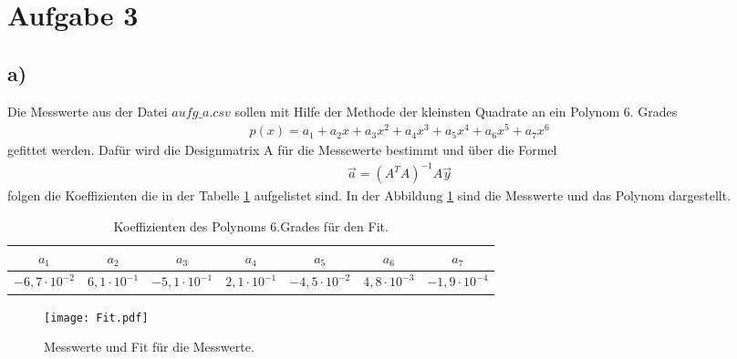 \newpage
\section{Aufgabe 3}
\label{sec:a1}
\subsection{a)}
\label{subsec:a1}

Die Messwerte aus der Datei $aufg\_a.csv$ sollen mit Hilfe der
Methode der kleinsten Quadrate an ein Polynom 6. Grades
\begin{align}
p(x)=a_1+a_2x+a_3x^2+ a_4x^3+a_5x^4+a_6x^5+a_7x^6
\end{align}
gefittet werden.
Dafür wird die Designmatrix A für die Messewerte bestimmt
 und über die Formel
 \begin{align}
\vec a =(A^TA)^{-1}A\vec y
 \end{align}
folgen die Koeffizienten die in der Tabelle \ref{tab:a} aufgelistet sind.
In der Abbildung \ref{fig:a} sind die Messwerte und das Polynom
dargestellt.
\begin{table}
  \caption{Koeffizienten des Polynoms 6.Grades für den Fit.}
  \label{tab:a}
  \begin{tabular}{c c c c c c c}
\toprule
    $a_1 $&$ a_2 $&$ a_3 $&$  a_4 $&$  a_5 $&$ a_6 $&$a_7$\\
\midrule
$-6,7\cdot10^{-2} $&$ 6,1\cdot10^{-1} $&$ -5,1\cdot10^{-1} $&$ 2,1\cdot10^{-1} $&$   -4,5\cdot10^{-2} $&$ 4,8\cdot10^{-3} $&$  -1,9\cdot10^{-4}$ \\
\bottomrule
  \end{tabular}
\end{table}


\begin{figure}
  \centering
  \texttt{[image: Fit.pdf]}
  \caption{Messwerte und Fit für die Messwerte.}
  \label{fig:a}
\end{figure}


\FloatBarrier
